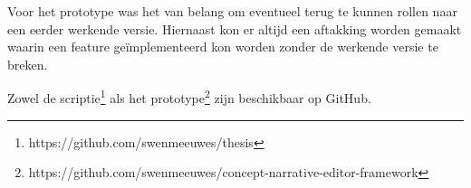 Voor het prototype was het van belang om eventueel terug te kunnen rollen naar een eerder werkende versie. Hiernaast kon er altijd een aftakking worden gemaakt waarin een feature geïmplementeerd kon worden zonder de werkende versie te breken.

Zowel de scriptie\footnote{https://github.com/swenmeeuwes/thesis} als het prototype\footnote{https://github.com/swenmeeuwes/concept-narrative-editor-framework} zijn beschikbaar op GitHub.
